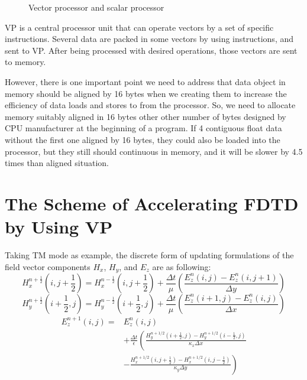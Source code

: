 \begin{figure}[hbtp]
	\caption{Vector processor and scalar processor}
	\label{ch3 fig:vectorprocessor}
\end{figure}

%

VP is a central processor unit that can operate vectors by a set of specific instructions. Several data are packed in some vectors by using instructions, and sent to VP. After being processed with desired operations, those vectors are sent to memory.

However, there is one important point we need to address that data object in memory should be aligned by 16 bytes when we creating them to increase the efficiency of data loads and stores to from the processor. So, we need to allocate memory suitably aligned in 16 bytes other other number of bytes designed by CPU manufacturer at the beginning of a program. If 4 contiguous float data without the first one aligned by 16 bytes, they could also be loaded into the processor, but they still should continuous in memory, and it will be slower by 4.5 times than aligned situation.

\section{The Scheme of Accelerating FDTD by Using VP}

Taking TM mode as example, the discrete form of updating formulations of the field vector components $H_x$, $H_y$, and $E_z$ are as following:
\begin{equation}\label{ch3: hx}
H^{n+\frac{1}{2}}_{x}\left(i,j+\frac{1}{2}\right)=H^{n-\frac{1}{2}}_{x}\left(i,j+\frac{1}{2}\right)+
\frac{\Delta t}{\mu}\left(
\frac{E^n_z(i,j)-E^n_z(i,j+1)}{\Delta y}
\right)
\end{equation}
\begin{equation}
H^{n+\frac{1}{2}}_{y}\left(i+\frac{1}{2},j\right)=H^{n-\frac{1}{2}}_{y}\left(i+\frac{1}{2},j\right)+
\frac{\Delta t}{\mu}\left(
\frac{E^n_z(i+1,j)-E^n_z(i,j)}{\Delta x}
\right)
\end{equation}
\begin{equation}\label{ch3: ez}
\begin{split}
E^{n+1}_z(i,j)=&E_z^n(i,j)\\
&+\frac{\Delta t}{\epsilon}\left(
\frac{H_y^{n+1/2}(i+\frac{1}{2},j)-H_y^{n+1/2}(i-\frac{1}{2},j)}{\kappa_x \Delta x}\right.\\
&\left.-\frac{H_x^{n+1/2}(i,j+\frac{1}{2})-H_x^{n+1/2}(i,j-\frac{1}{2})}{\kappa_y \Delta y}
\right)
\end{split}
\end{equation}

